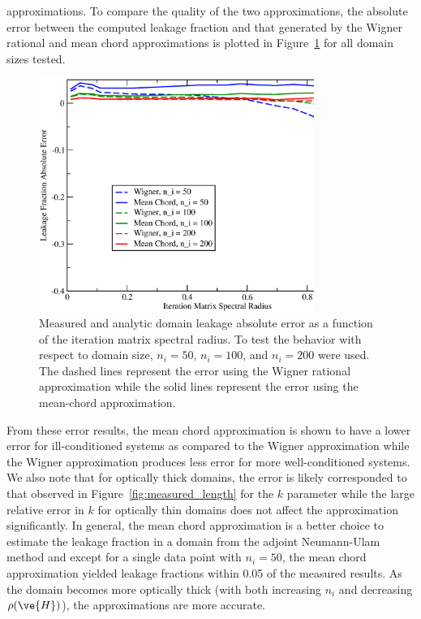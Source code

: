 \documentclass[preprint,11pt]{elsarticle}
\begin{document}
approximations. To compare the quality of the two approximations, the
absolute error between the computed leakage fraction and that
generated by the Wigner rational and mean chord approximations is
plotted in Figure~\ref{fig:leakage_error} for all domain sizes
tested. 
\begin{figure}[ht!]
  \begin{center}
    \includegraphics[width=0.8\textwidth]{leakage_error.eps}
  \end{center}
  \caption{Measured and analytic domain leakage absolute error as a
    function of the iteration matrix spectral radius.  To test the
    behavior with respect to domain size, $n_i=50$,
    $n_i=100$, and $n_i=200$ were used. The dashed
    lines represent the error using the Wigner rational
    approximation while the solid lines represent the error using
    the mean-chord approximation.}
  \label{fig:leakage_error}
\end{figure}
From these error results, the mean chord approximation is shown to have a
lower error for ill-conditioned systems as compared to the Wigner
approximation while the Wigner approximation produces less error for more
well-conditioned systems. We also note that for optically thick domains, the
error is likely corresponded to that observed in
Figure~\ref{fig:measured_length} for the $k$ parameter while the large
relative error in $k$ for optically thin domains does not affect the
approximation significantly. In general, the mean chord approximation is a
better choice to estimate the leakage fraction in a domain from the adjoint
Neumann-Ulam method and except for a single data point with $n_i=50$, the mean
chord approximation yielded leakage fractions within 0.05 of the measured
results. As the domain becomes more optically thick (with both increasing
$n_i$ and decreasing $\rho(\ve{H})$), the approximations are more accurate.
\end{document}
